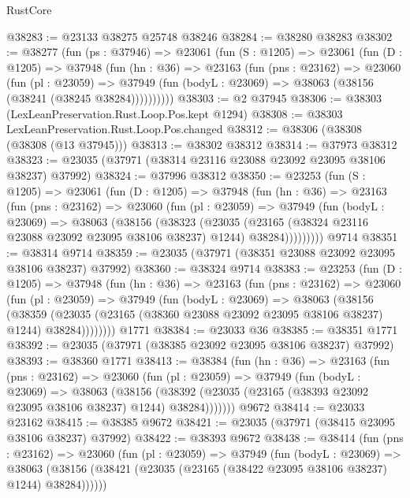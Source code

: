 \begin{lexlean}{RustCore}
\begin{coremodule}
@38283 := @23133 @38275 @25748 @38246
@38284 := @38280 @38283
@38302 := @38277
    (fun (ps : @37946) =>
    @23061
      (fun (S : @1205) =>
      @23061
        (fun (D : @1205) =>
        @37948
          (fun (hn : @36) =>
          @23163
            (fun (pns : @23162) =>
            @23060
              (fun (pl : @23059) =>
              @37949 (fun (bodyL : @23069) => @38063 (@38156 (@38241 (@38245 @38284))))))))))
@38303 := @2 @37945
@38306 := @38303 (LexLeanPreservation.Rust.Loop.Pos.kept @1294)
@38308 := @38303 LexLeanPreservation.Rust.Loop.Pos.changed
@38312 := @38306 (@38308 (@38308 (@13 @37945)))
@38313 := @38302 @38312
@38314 := @37973 @38312
@38323 := @23035 (@37971 (@38314 @23116 @23088 @23092 @23095 @38106 @38237) @37992)
@38324 := @37996 @38312
@38350 := @23253
    (fun (S : @1205) =>
    @23061
      (fun (D : @1205) =>
      @37948
        (fun (hn : @36) =>
        @23163
          (fun (pns : @23162) =>
          @23060
            (fun (pl : @23059) =>
            @37949
              (fun (bodyL : @23069) =>
              @38063
                (@38156
                  (@38323
                    (@23035
                      (@23165 (@38324 @23116 @23088 @23092 @23095 @38106 @38237) @1244)
                      @38284)))))))))
    @9714
@38351 := @38314 @9714
@38359 := @23035 (@37971 (@38351 @23088 @23092 @23095 @38106 @38237) @37992)
@38360 := @38324 @9714
@38383 := @23253
    (fun (D : @1205) =>
    @37948
      (fun (hn : @36) =>
      @23163
        (fun (pns : @23162) =>
        @23060
          (fun (pl : @23059) =>
          @37949
            (fun (bodyL : @23069) =>
            @38063
              (@38156
                (@38359
                  (@23035 (@23165 (@38360 @23088 @23092 @23095 @38106 @38237) @1244) @38284))))))))
    @1771
@38384 := @23033 @36
@38385 := @38351 @1771
@38392 := @23035 (@37971 (@38385 @23092 @23095 @38106 @38237) @37992)
@38393 := @38360 @1771
@38413 := @38384
    (fun (hn : @36) =>
    @23163
      (fun (pns : @23162) =>
      @23060
        (fun (pl : @23059) =>
        @37949
          (fun (bodyL : @23069) =>
          @38063
            (@38156
              (@38392 (@23035 (@23165 (@38393 @23092 @23095 @38106 @38237) @1244) @38284)))))))
    @9672
@38414 := @23033 @23162
@38415 := @38385 @9672
@38421 := @23035 (@37971 (@38415 @23095 @38106 @38237) @37992)
@38422 := @38393 @9672
@38438 := @38414
    (fun (pns : @23162) =>
    @23060
      (fun (pl : @23059) =>
      @37949
        (fun (bodyL : @23069) =>
        @38063 (@38156 (@38421 (@23035 (@23165 (@38422 @23095 @38106 @38237) @1244) @38284))))))

\end{coremodule}
\end{lexlean}
